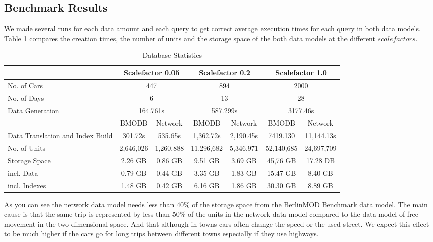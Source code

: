 \documentclass[a4paper]{article}
\newcommand{\bmodb} {BerlinMOD Benchmark}
\begin{document}
\subsection{Benchmark Results}
\label{sec:results}
We made several runs for each data amount and each query to get correct average execution times for each query in both data models. Table \ref{tab:dbstatistic} compares the creation times, the number of units and the storage space of the both data models at the different $scalefactors$.
\begin{table}[H]
\begin{center}
\begin{scriptsize}
\begin{tabularx}{1.0\textwidth}{|X|c|c|c|c|c|c|}
\hline
&\multicolumn{2}{c|}{\textbf{Scalefactor 0.05}}&\multicolumn{2}{c|}{\textbf{Scalefactor 0.2}}&\multicolumn{2}{c|}{\textbf{Scalefactor 1.0}}\\
\hline
No. of Cars&\multicolumn{2}{c|}{447}&\multicolumn{2}{c|}{894}&\multicolumn{2}{c|}{2000}\\
\hline
No. of Days&\multicolumn{2}{c|}{6}&\multicolumn{2}{c|}{13}&\multicolumn{2}{c|}{28}\\
\hline
Data Generation&\multicolumn{2}{c|}{164.761s}&\multicolumn{2}{c|}{587.299s}&\multicolumn{2}{c|}{3177.46s}\\
\hline
&BMODB&Network&BMODB&Network&BMODB&Network\\
\hline
Data Translation
and Index Build&301.72s&535.65s&1,362.72s&2,190.45s&7419.130&11,144.13s\\
\hline
No. of Units&2,646,026&1,260,888&11,296,682&5,346,971&52,140,685&24,697,709\\
\hline
Storage Space&2.26 GB&0.86 GB&9.51 GB&3.69 GB&45,76 GB&17.28 DB\\
incl. Data&0.79 GB&0.44 GB&3.35 GB&1.83 GB&15.47 GB& 8.40 GB\\
incl. Indexes&1.48 GB&0.42 GB&6.16 GB&1.86 GB&30.30 GB&8.89 GB\\
\hline
\end{tabularx}
\end{scriptsize}
\caption{Database Statistics}
\end{center}
\label{tab:dbstatistic}
\end{table}
As you can see the network data model needs less than 40\% of the storage space from
the \bmodb{} data model. The main cause is that the same trip is represented
by less than 50\% of the units in the network data model compared to the data
model of free movement in the two dimensional space. And that although in towns
cars often change the speed or the used street. We expect this effect to be much
higher if the cars go for long trips between different towns especially if they
use highways.
\end{document}
